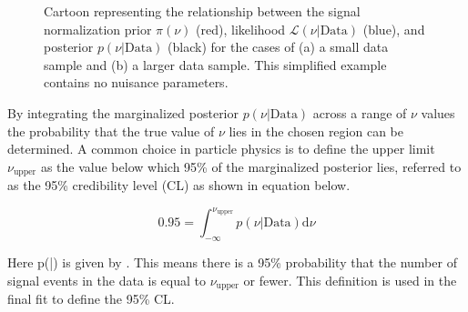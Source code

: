 \begin{figure}[!htbp]
\centering
{} \hfill
{}
\caption{Cartoon representing the relationship between the signal normalization prior $\pi(\nu)$ (red), likelihood $\mathcal{L}(\nu|\text{Data})$ (blue), and posterior $p(\nu|\text{Data})$ (black) for the cases of (a) a small data sample and (b) a larger data sample.  This simplified example contains no nuisance parameters.}
\label{sec:fit:marginalization}
\end{figure}

By integrating the marginalized posterior $p(\nu|\text{Data})$ across a range
of $\nu$ values the probability that the true value of $\nu$ lies in the chosen
region can be determined.  A common choice in particle physics is to define the
upper limit $\nu_{\text{upper}}$ as the value below which 95\% of the marginalized
posterior lies, referred to as the 95\% credibility level (CL) as shown in
equation  below.

\begin{equation} \label{eq:fit:limit}
0.95 = \int_{-\infty}^{\nu_{\text{upper}}} p(\nu|\text{Data}) \text{d}\nu
\end{equation}

Here p(\nu|) is given by . This means there is a
95\% probability that the number of signal events in the data is equal to
$\nu_{\text{upper}}$ or fewer.  This definition is used in the final fit to
define the 95\% CL.



